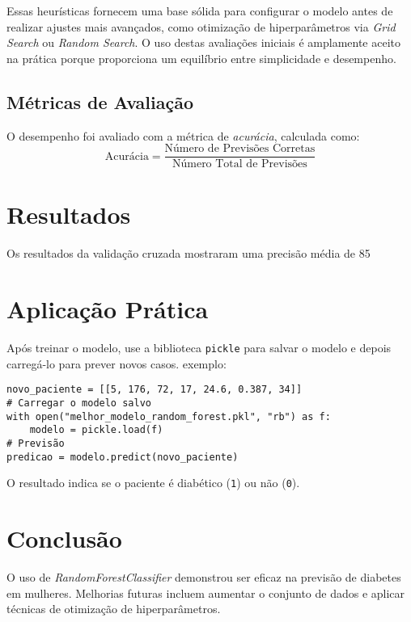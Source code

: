 \documentclass[a4paper,12pt]{article}
\begin{document}
Essas heurísticas fornecem uma base sólida para configurar o modelo antes de realizar ajustes mais avançados, como otimização de hiperparâmetros via \textit{Grid Search} ou \textit{Random Search}. O uso destas avaliações iniciais é amplamente aceito na prática porque proporciona um equilíbrio entre simplicidade e desempenho.

\subsection{Métricas de Avaliação}
O desempenho foi avaliado com a métrica de \textit{acurácia}, calculada como:
\[
\text{Acurácia} = \frac{\text{Número de Previsões Corretas}}{\text{Número Total de Previsões}}
\]

\section{Resultados}
Os resultados da validação cruzada mostraram uma precisão média de 85%

\section{Aplicação Prática}

Após treinar o modelo, use a biblioteca \texttt{pickle} para salvar o modelo e depois carregá-lo para prever novos casos. exemplo:
\begin{verbatim}
novo_paciente = [[5, 176, 72, 17, 24.6, 0.387, 34]]
# Carregar o modelo salvo
with open("melhor_modelo_random_forest.pkl", "rb") as f:
    modelo = pickle.load(f)
# Previsão
predicao = modelo.predict(novo_paciente)
\end{verbatim}

O resultado indica se o paciente é diabético (\texttt{1}) ou não (\texttt{0}).

\section{Conclusão}

O uso de \textit{RandomForestClassifier} demonstrou ser eficaz na previsão de diabetes em mulheres. Melhorias futuras incluem aumentar o conjunto de dados e aplicar técnicas de otimização de hiperparâmetros.
\end{document}
